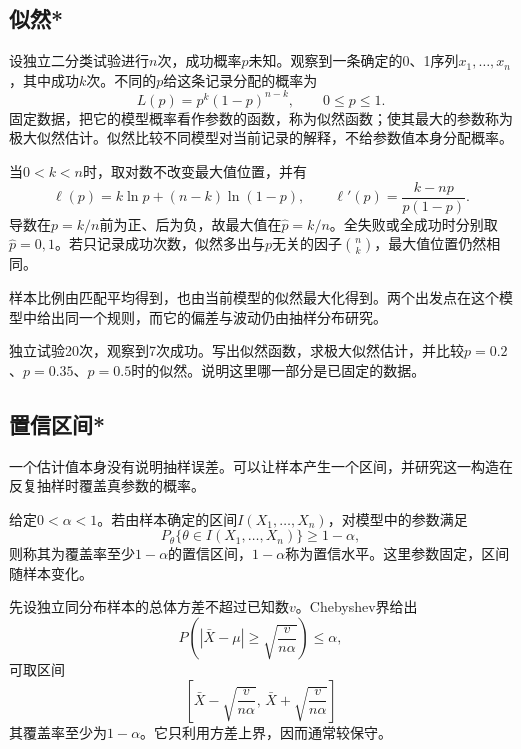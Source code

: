 \FloatBarrier
\newpage
\subsection{似然*}

设独立二分类试验进行\(n\)次，成功概率\(p\)未知。观察到一条确定的0、1序列\(x_1,\ldots,x_n\)，其中成功\(k\)次。不同的\(p\)给这条记录分配的概率为
\begin{equation}\label{eq:prob-likelihood}
 L(p)=p^k(1-p)^{n-k},\qquad 0\le p\le1.
\end{equation}
固定数据，把它的模型概率看作参数的函数，称为{\heiti 似然函数}；使其最大的参数称为{\heiti 极大似然估计}。似然比较不同模型对当前记录的解释，不给参数值本身分配概率。

当\(0<k<n\)时，取对数不改变最大值位置，并有
\[
 \ell(p)=k\ln p+(n-k)\ln(1-p),\qquad
 \ell'(p)=\frac{k-np}{p(1-p)}.
\]
导数在\(p=k/n\)前为正、后为负，故最大值在\(\widehat p=k/n\)。全失败或全成功时分别取\(\widehat p=0,1\)。若只记录成功次数，似然多出与\(p\)无关的因子\(\binom nk\)，最大值位置仍然相同。

样本比例由匹配平均得到，也由当前模型的似然最大化得到。两个出发点在这个模型中给出同一个规则，而它的偏差与波动仍由抽样分布研究。

\begin{exercise}
独立试验20次，观察到7次成功。写出似然函数，求极大似然估计，并比较\(p=0.2\)、\(p=0.35\)、\(p=0.5\)时的似然。说明这里哪一部分是已固定的数据。
\end{exercise}

\subsection{置信区间*}

一个估计值本身没有说明抽样误差。可以让样本产生一个区间，并研究这一构造在反复抽样时覆盖真参数的概率。

\begin{definition}
给定\(0<\alpha<1\)。若由样本确定的区间\(I(X_1,\ldots,X_n)\)，对模型中的参数满足
\[
 P_\theta\{\theta\in I(X_1,\ldots,X_n)\}\ge1-\alpha,
\]
则称其为覆盖率至少\(1-\alpha\)的{\heiti 置信区间}，\(1-\alpha\)称为置信水平。这里参数固定，区间随样本变化。
\end{definition}

先设独立同分布样本的总体方差不超过已知数\(v\)。Chebyshev界给出
\[
 P\left(|\bar X-\mu|\ge\sqrt{\frac{v}{n\alpha}}\right)\le\alpha,
\]
可取区间
\begin{equation}\label{eq:prob-chebyshev-interval}
 \left[\bar X-\sqrt{\frac{v}{n\alpha}},\,
       \bar X+\sqrt{\frac{v}{n\alpha}}\right]
\end{equation}
其覆盖率至少为\(1-\alpha\)。它只利用方差上界，因而通常较保守。

